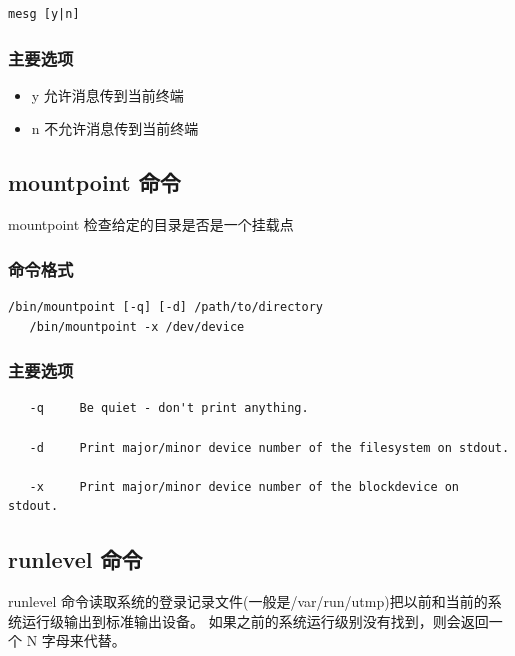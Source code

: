 {\begin{shaded}\begin{verbatim}
mesg [y|n]
\end{verbatim}\end{shaded}}
\subsubsection{主要选项}

\begin{itemize}
\item
  y 允许消息传到当前终端
\item
  n 不允许消息传到当前终端
\end{itemize}
\subsection{mountpoint 命令}

mountpoint 检查给定的目录是否是一个挂载点

\subsubsection{命令格式}

{\begin{shaded}\begin{verbatim}
/bin/mountpoint [-q] [-d] /path/to/directory
   /bin/mountpoint -x /dev/device
\end{verbatim}\end{shaded}}
\subsubsection{主要选项}

{\begin{shaded}\begin{verbatim}
   -q     Be quiet - don't print anything.

   -d     Print major/minor device number of the filesystem on stdout.

   -x     Print major/minor device number of the blockdevice on stdout.
\end{verbatim}\end{shaded}}
\subsection{runlevel 命令}

runlevel
命令读取系统的登录记录文件(一般是/var/run/utmp)把以前和当前的系统运行级输出到标准输出设备。
如果之前的系统运行级别没有找到，则会返回一个 N 字母来代替。

